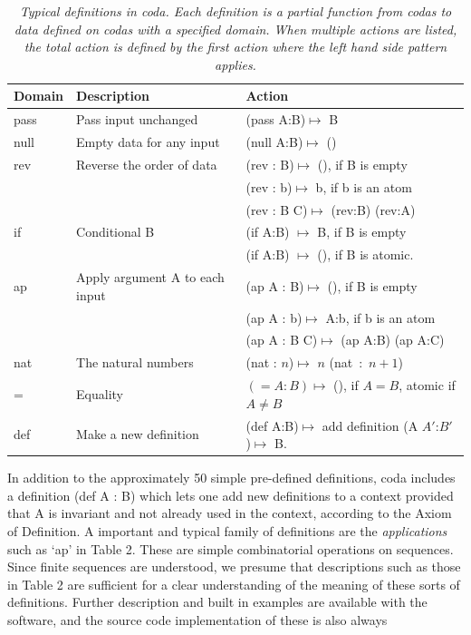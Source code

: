 \documentclass[11pt]{article}
\begin{document}
\begin{table}
\begin{tabular}{ | l | l | l | }
Domain & Description & Action \\
\hline
pass & Pass input unchanged & (pass A:B)$\mapsto$ B \\
\hline
null & Empty data for any input & (null A:B)$\mapsto$ () \\
\hline
rev & Reverse the order of data & (rev : B)$\mapsto$ (), if B is empty \\
 &  & (rev : b)$\mapsto$ b, if b is an atom \\
 & & (rev : B C)$\mapsto$ (rev:B) (rev:A) \\
 \hline
 if & Conditional B & (if A:B) $\mapsto$ B, if B is empty \\
 & & (if A:B) $\mapsto$ (), if B is atomic. \\
 \hline
 ap & Apply argument A to each input & (ap A : B)$\mapsto$ (), if B is empty \\
  & & (ap A : b)$\mapsto$ A:b, if b is an atom \\
  & & (ap A : B C)$\mapsto$ (ap A:B) (ap A:C) \\
\hline
nat & The natural numbers & (nat : $n$)$\mapsto$ $n$ (nat\ :\ $n+1$) \\
\hline
= & Equality & $(=A:B)\mapsto$ (), if $A=B$, atomic if $A\neq B$ \\
\hline
def & Make a new definition & (def A:B)$\mapsto$ add definition (A $A'$:$B'$)$\mapsto$ B. \\
\hline
\end{tabular}
\caption{\label{ }{\it Typical definitions in coda.  Each definition is a partial function from codas to data defined on
codas with a specified domain.  When multiple actions are listed, the total action is defined by the first action
where the left hand side pattern applies.}}
\end{table}
In addition to the approximately 50 simple pre-defined definitions, coda includes a definition (def A : B) which lets one
add new definitions to a context provided that A is invariant and not already used in the context, according to the Axiom of Definition.
A important and typical family of definitions are the {\it applications} such as `ap' in Table 2.  These
are simple combinatorial operations on sequences.  Since finite sequences are understood, we presume that descriptions
such as those in Table 2 are sufficient for a clear understanding of the meaning of these sorts of definitions.  Further description and built in examples are available with the software, and the source code implementation of these is also always
\end{document}
